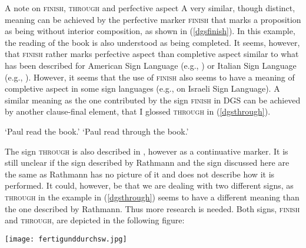 \begin{digression}{{A note on \textsc{finish}, \textsc{through} and perfective aspect}}{}
\noindent \label{exkursfertigdurch}A very similar, though distinct, meaning can be achieved by the perfective marker \textsc{finish} that marks a proposition as being without interior composition, as shown in (\ref{dgsfinish}). In this example, the reading of the book is also understood as being completed. It seems, however, that \textsc{finish} rather marks perfective aspect than completive aspect similar to what has been described for American Sign Language (e.g., \citealt{aarons1992clausal}) or Italian Sign Language (e.g., \citealt{zucchi2003}). However, it seems that the use of \textsc{finish} also seems to have a meaning of completive aspect in some sign languages (e.g., \citealt{meir1999aperfect} on Israeli Sign Language). A similar meaning as the one contributed by the sign \textsc{finish} in DGS can be achieved by another clause-final element, that I glossed \textsc{through} in (\ref{dgsthrough}).


\begin{exe}
\ex\label{ex:perfectivea}\begin{xlist}
\glt `Paul read the book.' \label{dgsfinish}
\glt `Paul read through the book.' \label{dgsthrough}
\end{xlist}
\end{exe}

\noindent The sign \textsc{through} is also described in \citet[259]{rathmann2005event}, however as a continuative marker. It is still unclear if the sign described by Rathmann and the sign discussed here are the same as Rathmann has no picture of it and does not describe how it is performed. It could, however, be that we are dealing with two different signs, as \textsc{through} in the example in (\ref{dgsthrough}) seems to have a different meaning than the one described by Rathmann. Thus more research is needed. Both signs, \textsc{finish} and \textsc{through}, are depicted in the following figure: \\

\begin{center}
	\texttt{[image: fertigunddurchsw.jpg]}
	\end{center}
\newpage


\end{digression}
